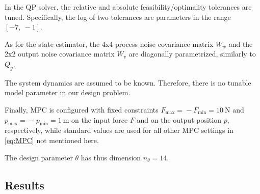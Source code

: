 \documentclass{article}
\newcommand{\ntheta}{n_\theta}
\begin{document}
In the QP solver, the relative and absolute feasibility/optimality tolerances are tuned. Specifically, the log of two tolerances are parameters in the range $[-7,\ -1]$. 

As for the state estimator, the 4x4 process noise covariance matrix $W_w$ and the 2x2 output noise covariance matrix $W_v$ are diagonally parametrized, similarly to  $Q_y$.

The system dynamics are assumed to be known. Therefore, there is no tunable model parameter in our design problem. 

Finally, MPC is configured with fixed constraints $F_{\max}\!=\!-F_{\min}\!=\!10~\mathrm{N}$ and $p_{\max}\!=\!-p_{\min}\!=\!1~\mathrm{m}$ on the input force $F$ and on the output position $p$, respectively, while standard values are used for all other MPC settings in \eqref{eq:MPC} not mentioned here.

The design parameter $\theta$ has thus dimension $\ntheta=14$.

\subsection{Results}
\end{document}
